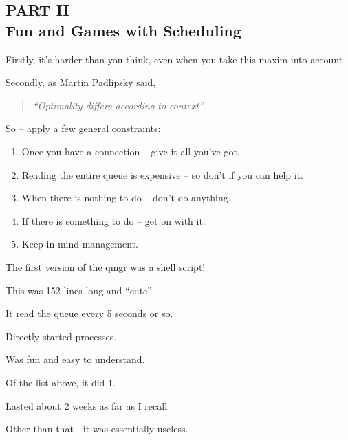 \begin{bwslide}
\part*{PART II\\
Fun and Games with Scheduling}
\end{bwslide}

\begin{bwslide}
\begin{nrtc}
\item	Firstly, it's harder than you think, even when you take this
maxim into account

\item	Secondly, as Martin Padlipsky said,
\begin{quote}\em
``Optimality differs according to context''.
\end{quote}

\item	So -- apply a few general constraints:
	\begin{enumerate}
	\item	Once you have a connection -- give it all you've got.
	\item	Reading the entire queue is expensive -- so don't if
		you can help it.
	\item	When there is nothing to do -- don't do anything.
	\item	If there is something to do -- get on with it.
	\item	Keep in mind management.
	\end{enumerate}

\end{nrtc}
\end{bwslide}

\begin{bwslide}
\begin{nrtc}
\item	The first version of the qmgr was a shell script!
\item	This was 152 lines long and ``cute''
\item	It read the queue every 5 seconds or so.
\item	Directly started processes.
\item	Was fun and easy to understand.
\item	Of the list above, it did 1.
\item	Lasted about 2 weeks as far as I recall
\item	Other than that - it was essentially useless.
\end{nrtc}
\end{bwslide}

